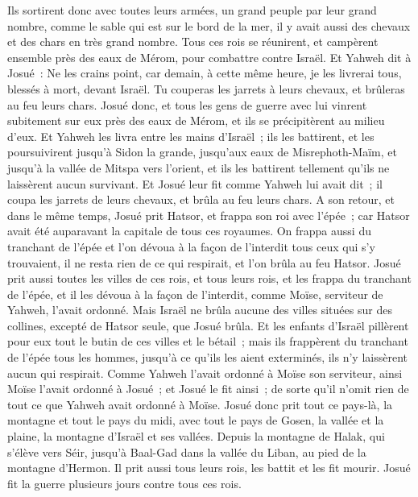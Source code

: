 \begin{multicols}{2}
Ils sortirent donc avec toutes leurs armées, un grand peuple par leur grand nombre, comme le sable qui est sur le bord de la mer, il y avait aussi des chevaux et des chars en très grand nombre.
Tous ces rois se réunirent, et campèrent ensemble près des eaux de Mérom, pour combattre contre Israël.
Et Yahweh dit à Josué~: Ne les crains point, car demain, à cette même heure, je les livrerai tous, blessés à mort, devant Israël. Tu couperas les jarrets à leurs chevaux, et brûleras au feu leurs chars.
Josué donc, et tous les gens de guerre avec lui vinrent subitement sur eux près des eaux de Mérom, et ils se précipitèrent au milieu d'eux.
Et Yahweh les livra entre les mains d'Israël~; ils les battirent, et les poursuivirent jusqu'à Sidon la grande, jusqu'aux eaux de Misrephoth-Maïm, et jusqu'à la vallée de Mitspa vers l'orient, et ils les battirent tellement qu'ils ne laissèrent aucun survivant.
Et Josué leur fit comme Yahweh lui avait dit~; il coupa les jarrets de leurs chevaux, et brûla au feu leurs chars.
A son retour, et dans le même temps, Josué prit Hatsor, et frappa son roi avec l'épée~; car Hatsor avait été auparavant la capitale de tous ces royaumes.
On frappa aussi du tranchant de l'épée et l'on dévoua à la façon de l'interdit tous ceux qui s'y trouvaient, il ne resta rien de ce qui respirait, et l'on brûla au feu Hatsor.
Josué prit aussi toutes les villes de ces rois, et tous leurs rois, et les frappa du tranchant de l'épée, et il les dévoua à la façon de l'interdit, comme Moïse, serviteur de Yahweh, l'avait ordonné.
Mais Israël ne brûla aucune des villes situées sur des collines, excepté de Hatsor seule, que Josué brûla.
Et les enfants d'Israël pillèrent pour eux tout le butin de ces villes et le bétail~; mais ils frappèrent du tranchant de l'épée tous les hommes, jusqu'à ce qu'ils les aient exterminés, ils n'y laissèrent aucun qui respirait.
Comme Yahweh l'avait ordonné à Moïse son serviteur, ainsi Moïse l'avait ordonné à Josué~; et Josué le fit ainsi~; de sorte qu'il n'omit rien de tout ce que Yahweh avait ordonné à Moïse. 
Josué donc prit tout ce pays-là, la montagne et tout le pays du midi, avec tout le pays de Gosen, la vallée et la plaine, la montagne d'Israël et ses vallées.
Depuis la montagne de Halak, qui s'élève vers Séir, jusqu'à Baal-Gad dans la vallée du Liban, au pied de la montagne d'Hermon. Il prit aussi tous leurs rois, les battit et les fit mourir.
 Josué fit la guerre plusieurs jours contre tous ces rois.

\end{multicols}
